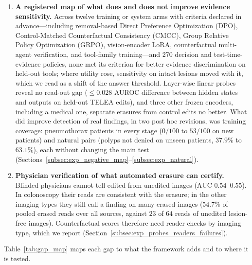 \documentclass[5p,times,twocolumn,authoryear]{elsarticle}
\begin{document}
\begin{enumerate}[leftmargin=*,nosep]
    \item \textbf{A registered map of what does and does not improve evidence sensitivity.} Across twelve training or system arms with criteria declared in advance---including removal-based Direct Preference Optimization (DPO), Control-Matched Counterfactual Consistency (CMCC), Group Relative Policy Optimization (GRPO), vision-encoder LoRA, counterfactual multi-agent verification, and tool-family training---and 270 decision and test-time-evidence policies, none met its criterion for better evidence discrimination on held-out tools; where utility rose, sensitivity on intact lesions moved with it, which we read as a shift of the answer threshold. Layer-wise linear probes reveal no read-out gap ($\le 0.028$ AUROC difference between hidden states and outputs on held-out TELEA edits), and three other frozen encoders, including a medical one, separate erasures from control edits no better. What did improve detection of real findings, in two post hoc revisions, was training coverage: pneumothorax patients in every stage ($0/100$ to $53/100$ on new patients) and natural pairs (polyps not denied on unseen patients, $37.9\%$ to $63.1\%$), each without changing the main test (Sections~\ref{subsec:exp_negative_map}--\ref{subsec:exp_natural}).
    \item \textbf{Physician verification of what automated erasure can certify.} Blinded physicians cannot tell edited from unedited images ($\text{AUC } 0.54\text{--}0.55$). In colonoscopy their reads are consistent with the erasure; in the other imaging types they still call a finding on many erased images ($54.7\%$ of pooled erased reads over all sources, against $23$ of $64$ reads of unedited lesion-free images). Counterfactual scores therefore need reader checks by imaging type, which we report (Section~\ref{subsec:exp_probes_readers_failures}).
\end{enumerate}

Table~\ref{tab:gap_map} maps each gap to what the framework adds and to where it is tested.
\end{document}
